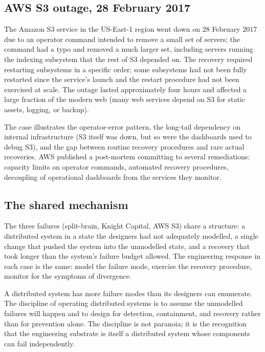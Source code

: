\subsection{AWS S3 outage, 28 February 2017}

The Amazon S3 service in the US-East-1 region went down on $28$ February $2017$ due to an operator command intended to remove a small set of servers; the command had a typo and removed a much larger set, including servers running the indexing subsystem that the rest of S3 depended on. The recovery required restarting subsystems in a specific order; some subsystems had not been fully restarted since the service's launch and the restart procedure had not been exercised at scale. The outage lasted approximately four hours and affected a large fraction of the modern web (many web services depend on S3 for static assets, logging, or backup).

The case illustrates the operator-error pattern, the long-tail dependency on internal infrastructure (S3 itself was down, but so were the dashboards used to debug S3), and the gap between routine recovery procedures and rare actual recoveries. AWS published a post-mortem committing to several remediations: capacity limits on operator commands, automated recovery procedures, decoupling of operational dashboards from the services they monitor.

\subsection{The shared mechanism}

The three failures (split-brain, Knight Capital, AWS S3) share a structure: a distributed system in a state the designers had not adequately modelled, a single change that pushed the system into the unmodelled state, and a recovery that took longer than the system's failure budget allowed. The engineering response in each case is the same: model the failure mode, exercise the recovery procedure, monitor for the symptoms of divergence.

\begin{principle}
A distributed system has more failure modes than its designers can enumerate. The discipline of operating distributed systems is to assume the unmodelled failures will happen and to design for detection, containment, and recovery rather than for prevention alone. The discipline is not paranoia; it is the recognition that the engineering substrate is itself a distributed system whose components can fail independently.
\end{principle}

